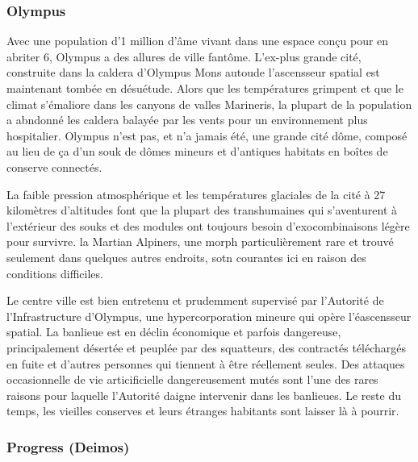                                                                \subsubsection{Olympus} \label{sec:olympus} 

                                                               Avec une population d'1 million d'âme vivant dans une espace conçu pour en abriter 6, Olympus a des allures de ville fantôme. L'ex-plus grande cité, construite dans la caldera d'Olympus Mons autoude l'ascensseur spatial est maintenant tombée en désuétude. Alors que les températures grimpent et que le climat s'émaliore dans les canyons de valles Marineris, la plupart de la population a abndonné les caldera balayée par les vents pour un environnement plus hospitalier. Olympus n'est pas, et n'a jamais été, une grande cité dôme, composé au lieu de ça d'un souk de dômes mineurs et d'antiques habitats en boîtes de conserve connectés. 

                                                               La faible pression atmosphérique et les températures glaciales de la cité à 27 kilomètres d'altitudes font que la plupart des transhumaines qui s'aventurent à l'extérieur des souks et des modules ont toujours besoin d'exocombinaisons légère pour survivre. la Martian Alpiners, une morph particulièrement rare et trouvé seulement dans quelques autres endroits, sotn courantes ici en raison des conditions difficiles. 

                                                               Le centre ville est bien entretenu et prudemment supervisé par l'Autorité de l'Infrastructure d'Olympus, une hypercorporation mineure qui opère l'éascensseur spatial. La banlieue est en déclin économique et parfois dangereuse, principalement désertée et peuplée par des squatteurs, des contractés téléchargés en fuite et d'autres personnes qui tiennent à être réellement seules. Des attaques occasionnelle de vie articificielle dangereusement mutés sont l'une des rares raisons pour laquelle l'Autorité daigne intervenir dans les banlieues. Le reste du temps, les vieilles conserves et leurs étranges habitants sont laisser là à pourrir. 

                                                               \subsubsection{Progress (Deimos)} \label{sec:progress-deimos} 

